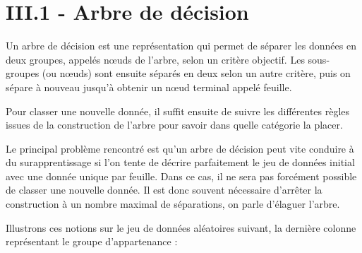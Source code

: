 \documentclass[10pt]{article}
\begin{document}
\section{III.1 - Arbre de décision}
Un arbre de décision est une représentation qui permet de séparer les données en deux groupes, appelés nœuds de l'arbre, selon un critère objectif. Les sous-groupes (ou nœuds) sont ensuite séparés en deux selon un autre critère, puis on sépare à nouveau jusqu'à obtenir un nœud terminal appelé feuille.

Pour classer une nouvelle donnée, il suffit ensuite de suivre les différentes règles issues de la construction de l'arbre pour savoir dans quelle catégorie la placer.

Le principal problème rencontré est qu'un arbre de décision peut vite conduire à du surapprentissage si l'on tente de décrire parfaitement le jeu de données initial avec une donnée unique par feuille. Dans ce cas, il ne sera pas forcément possible de classer une nouvelle donnée. Il est donc souvent nécessaire d'arrêter la construction à un nombre maximal de séparations, on parle d'élaguer l'arbre.

Illustrons ces notions sur le jeu de données aléatoires suivant, la dernière colonne représentant le groupe d'appartenance :
\end{document}
